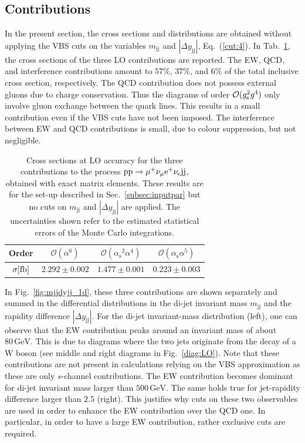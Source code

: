 \documentclass[twocolumn,epjc3]{svjour3} %
\newcommand{\Pj}{\ensuremath{\text{j}}\xspace}
\newcommand{\GeV}{\ensuremath{\,\text{GeV}}\xspace}
\newcommand{\alphas}{\ensuremath{\alpha_\text{s}}\xspace}
\begin{document}
    \subsection{Contributions}
        \label{subsec:contributions}
    In the present section, the cross sections and distributions are obtained without applying the VBS cuts on the variables $m_{\Pj\Pj}$ and $|\Delta y_{\Pj\Pj}|$, 
    Eq.~(\ref{cut:4}).
    In Tab.~\ref{tab:LOscanXsec}, the cross sections of the three LO contributions are reported.
    The EW, QCD, and interference contributions amount to $57\%$, $37\%$, and $6\%$ of the total inclusive cross section, respectively.
    The QCD contribution does not possess external gluons due to charge conservation.
    Thus the diagrams of order $\mathcal{O}(g_{\rm s}^2g^4)$ only involve gluon exchange between the quark lines.
    This results in a small contribution even if the VBS cuts have not been imposed.
    The interference between EW and QCD contributions is small, due to colour suppression, but not negligible.

    \begin{table}
        \centering
        \begin{tabular}{c|c|c|c}
            Order & $\mathcal{O}(\alpha^6)$ & $\mathcal{O}(\alphas^2\alpha^4)$ & $\mathcal{O}(\alphas\alpha^5)$ \\
            \hline
            \hline
            $\sigma[\rm{fb}]$ & $ 2.292 \pm 0.002 $ & $ 1.477 \pm 0.001 $ & $ 0.223 \pm 0.003 $ \\
        \end{tabular}
        \caption{\label{tab:LOscanXsec} Cross sections at LO accuracy for the three contributions to the process ${\rm p}{\rm p}\to\mu^+\nu_\mu{\rm e}^+\nu_{\rm e}{\rm j}{\rm j}$, obtained with exact matrix elements.
        These results are for the set-up described in Sec.~\protect\ref{subsec:inputpar} but no cuts on $m_{\Pj\Pj}$ and $|\Delta y_{\Pj\Pj}|$ are applied.
        The uncertainties shown refer to the estimated statistical errors of the Monte Carlo integrations.}
    \end{table}

    In Fig.~\ref{fig:mjjdyjj_1d}, these three contributions are shown separately and summed in the differential distributions in the di-jet invariant mass $m_{\Pj\Pj}$ and the rapidity difference $|\Delta y_{\Pj\Pj}|$.
    For the di-jet invariant-mass distribution (left), one can observe that the EW contribution peaks around an invariant mass of about $80\GeV$.
    This is due to diagrams where the two jets originate from the decay of a W boson (see middle and right diagrams in Fig.~\ref{diag:LO}).
    Note that these contributions are not present in calculations relying on the VBS approximation as these are only $s$-channel contributions.
    The EW contribution becomes dominant for di-jet invariant mass larger than $500\GeV$.
    The same holds true for jet-rapidity difference larger than $2.5$ (right).
    This justifies why cuts on these two observables are used in order to enhance the EW contribution over the QCD one.
    In particular, in order to have a large EW contribution, rather exclusive cuts are required.
\end{document}
